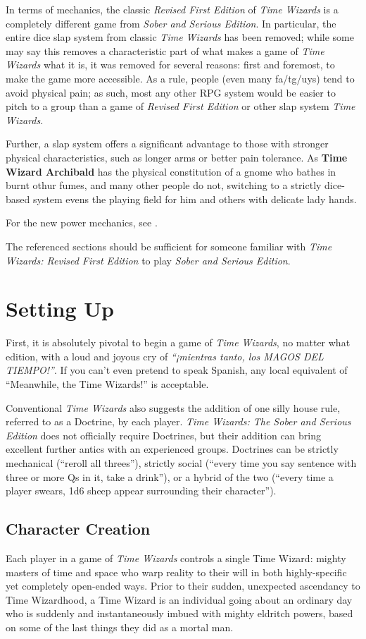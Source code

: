 \documentclass{article}
\newcommand{\twsse}{\emph{Time Wizards: The Sober and Serious Edition}}
\newcommand{\tw}{\emph{Time Wizards}}
\newcommand{\sse}{\emph{Sober and Serious Edition}}
\newcommand{\rfe}{\emph{Revised First Edition}}
\newcommand{\namefag}[2][]{{\color{anongreen} \textbf{#2}#1}}
\begin{document}
In terms of mechanics, the classic \rfe{} of \tw{} is a completely different game from \sse{}.
In particular, the entire dice slap system from classic \tw{} has been removed; while some may
say this removes a characteristic part of what makes a game of \tw{} what it is, it was removed
for several reasons: first and foremost, to make the game more accessible. As a rule, people
(even many fa/tg/uys) tend to avoid physical pain; as such, most any other RPG system would be
easier to pitch to a group than a game of \rfe{} or other slap system \tw{}.

Further, a slap system offers a significant advantage to those with stronger physical
characteristics, such as longer arms or better pain tolerance. As \namefag{Time Wizard Archibald}
has the physical constitution of a gnome who bathes in burnt othur fumes, and many other people
do not, switching to a strictly dice-based system evens the playing field for him and others with
delicate lady hands.

For the new power mechanics, see .

The referenced sections should be sufficient for someone familiar with \emph{Time Wizards:
Revised First Edition} to play \sse{}.

\section{Setting Up} \label{sec:setup}
First, it is absolutely pivotal to begin a game of \tw{}, no matter what edition, with a loud
and joyous cry of \emph{``¡mientras tanto, los MAGOS DEL TIEMPO!''}. If you can't even pretend
to speak Spanish, any local equivalent of ``Meanwhile, the Time Wizards!'' is acceptable.

Conventional \tw{} also suggests the addition of one silly house rule, referred to as a Doctrine,
by each player. \twsse{} does not officially require Doctrines, but their addition can bring
excellent further antics with an experienced groups. Doctrines can be strictly mechanical
(``reroll all threes''), strictly social (``every time you say sentence with three or more Qs
in it, take a drink''), or a hybrid of the two (``every time a player swears, 1d6 sheep appear
surrounding their character'').

\subsection{Character Creation} \label{ssec:creation}
Each player in a game of \tw{} controls a single Time Wizard: mighty masters of time and space
who warp reality to their will in both highly-specific yet completely open-ended ways. Prior to
their sudden, unexpected ascendancy to Time Wizardhood, a Time Wizard is an individual going
about an ordinary day who is suddenly and instantaneously imbued with mighty eldritch powers,
based on some of the last things they did as a mortal man.
\end{document}
